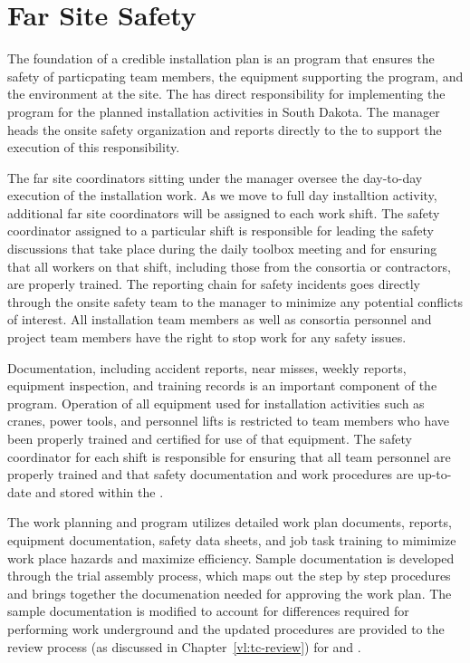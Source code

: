 \section{Far Site Safety}
\label{sec:far_site_safety}

The foundation of a credible installation plan is 
an  program that ensures the safety of particpating team 
members, the equipment supporting the program, and the environment 
at the  site.  The  has direct responsibility 
for implementing the   program for
the planned installation activities in South Dakota.  
The   manager heads the onsite safety 
organization and reports directly to the  to support
the execution of this responsibility.

The far site  coordinators sitting under the
  manager oversee the day-to-day execution
of the installation work. As we move to full day installtion activity,
additional far site  coordinators will be assigned to each
work shift.  The safety coordinator assigned
to a particular shift is responsible for leading the safety
discussions that take place during the daily toolbox meeting and for
ensuring that all workers on that shift, including those from the
consortia or contractors, are properly trained.  The reporting chain for safety
incidents goes directly through the onsite safety team to the
  manager to minimize any potential
conflicts of interest.  All  installation team members as
well as  consortia personnel and  project team
members have the right to stop work for any safety issues.

Documentation, including accident reports, near misses, weekly reports, 
equipment inspection, and training records is an important component of 
the   program.  Operation of all equipment 
used for  installation activities such as cranes, power 
tools, and personnel lifts is restricted to team members who have been
properly trained and certified for use of that equipment.  The safety 
coordinator for each shift is responsible for ensuring that all team 
personnel are properly trained and that safety documentation and work 
procedures are up-to-date and stored within the .  

The work planning and  program utilizes detailed work plan
documents,  reports, equipment documentation, safety data
sheets,  and job task training to mimimize work place
hazards and maximize efficiency.  Sample documentation is developed
through the  trial assembly process, which maps out
the step by step procedures and brings together the documenation
needed for approving the work plan.  The sample documentation is modified to
account for differences required for performing work underground and
the updated procedures are provided to the review process (as
discussed in Chapter~\ref{vl:tc-review}) for  and
.

